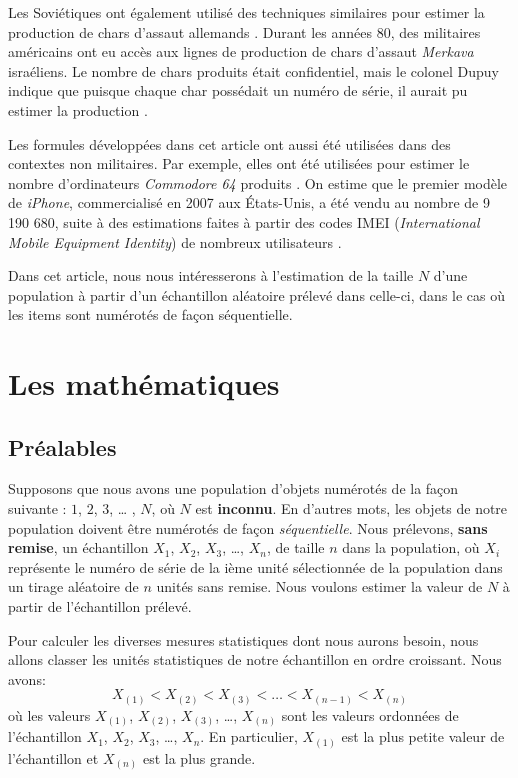 \documentclass[10pt]{article}
\begin{document}
Les Soviétiques ont également utilisé des techniques similaires pour
estimer la production de chars d'assaut allemands \cite{Volz2008}.
Durant les années 80, des militaires américains ont eu accès aux lignes
de production de chars d'assaut \emph{Merkava} israéliens. Le nombre de
chars produits était confidentiel, mais le colonel Dupuy indique que
puisque chaque char possédait un numéro de série, il aurait pu estimer
la production \cite{Johnson}.

Les formules développées dans cet article ont aussi été utilisées dans
des contextes non militaires. Par exemple, elles ont été utilisées pour
estimer le nombre d'ordinateurs \emph{Commodore 64} produits
\cite{commodore64}. On estime que le premier modèle de \emph{iPhone},
commercialisé en 2007 aux États-Unis, a été vendu au nombre de 9 190
680, suite à des estimations faites à partir des codes IMEI
(\emph{International Mobile Equipment Identity}) de nombreux
utilisateurs \cite{iphone}.

Dans cet article, nous nous intéresserons à l'estimation de la taille
\(N\) d'une population à partir d'un échantillon aléatoire prélevé dans
celle-ci, dans le cas où les items sont numérotés de façon séquentielle.

\hypertarget{les-mathematiques}{%
\section{\texorpdfstring{Les mathématiques
\label{maths}}{Les mathématiques }}\label{les-mathematiques}}

\hypertarget{prealables}{%
\subsection{Préalables}\label{prealables}}

Supposons que nous avons une population d'objets numérotés de la façon
suivante : \(1\), \(2\), \(3\), \ldots{} , \(N\), où \(N\) est
\textbf{inconnu}. En d'autres mots, les objets de notre population
doivent être numérotés de façon \emph{séquentielle}. Nous prélevons,
\textbf{sans remise}, un échantillon \(X_1\), \(X_2\), \(X_3\),
\ldots{}, \(X_n\), de taille \(n\) dans la population, où \(X_i\)
représente le numéro de série de la ième unité sélectionnée de la
population dans un tirage aléatoire de \(n\) unités sans remise. Nous
voulons estimer la valeur de \(N\) à partir de l'échantillon prélevé.

Pour calculer les diverses mesures statistiques dont nous aurons besoin,
nous allons classer les unités statistiques de notre échantillon en
ordre croissant. Nous avons:
\[X_{(1)} <  X_{(2)} < X_{(3)} < \ldots < X_{(n-1)} < X_{(n)}\] où les
valeurs \(X_{(1)}\), \(X_{(2)}\), \(X_{(3)}\), \ldots{}, \(X_{(n)}\)
sont les valeurs ordonnées de l'échantillon \(X_1\), \(X_2\), \(X_3\),
\ldots{}, \(X_n\). En particulier, \(X_{(1)}\) est la plus petite valeur
de l'échantillon et \(X_{(n)}\) est la plus grande.
\end{document}
